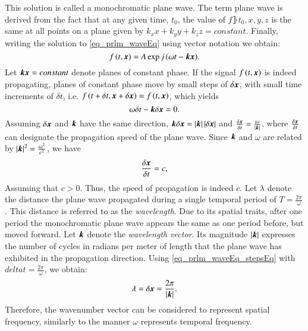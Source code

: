 This solution is called a monochromatic plane wave. The term plane wave is derived from the fact that at any given time, $t_{0}$, the value of $f\rBrace{t_{0},x,y,z}$ is the same at all points on a plane given by $k_{x}x+k_{y}y+k_{z}z = constant$.
Finally, writing the solution to \eqref{eq_prlm_waveEq} using vector notation we obtain:
\begin{equation}
\label{eq_prlm_waveEq_finSol}
f\left({t,\boldsymbol{x}}\right)=A\exp{j\left({\omega{t}-\boldsymbol{k}\boldsymbol{x}}\right)}.
\end{equation}
Let $\boldsymbol{k}\boldsymbol{x}=constant$ denote planes of constant phase. 
If the signal $f\left({t,\boldsymbol{x}}\right)$ is indeed propagating, planes of constant phase move by small steps of $\delta{\boldsymbol{x}}$, with small time increments of $\delta{t}$, i.e. $f\left({t+\delta{t},\boldsymbol{x}+\delta{\boldsymbol{x}}}\right) = f\left({t,\boldsymbol{x}}\right)$, which yields
\begin{equation}
\omega\delta{t}-\boldsymbol{k}\delta\boldsymbol{x}=0.
\end{equation}
Assuming $\delta\boldsymbol{x}$ and $\boldsymbol{k}$ have the same direction, $\boldsymbol{k}\delta\boldsymbol{x} = \left\vert\boldsymbol{k}\right\vert\left\vert\delta\boldsymbol{x}\right\vert$ and $\frac{\delta{\boldsymbol{x}}}{\delta{t}} = \frac{\omega}{\left\vert\boldsymbol{k}\right\vert}$, where $\frac{\delta{\boldsymbol{x}}}{\delta{t}}$ can designate the propagation speed of the plane wave. 
Since $\boldsymbol{k}$ and $\omega$ are related by $\left\vert\boldsymbol{k}\right\vert^{2}=\frac{\omega^{2}}{c^{2}}$, we have
\begin{equation}
\label{eq_prlm_waveEq_stepsEq}
\frac{\delta{\boldsymbol{x}}}{\delta{t}}=c,
\end{equation}
Assuming that $c>0$.
Thus, the speed of propagation is indeed $c$.
Let $\lambda$ denote the distance the plane wave propagated during a single temporal period of $T=\frac{2\pi}{\omega}$.
This distance is referred to as the \emph{wavelength}. 
Due to its spatial traits, after one period the monochromatic plane wave appears the same as one period before, but moved forward.
Let $\boldsymbol{k}$ denote the \emph{wavelength vector}. 
Its magnitude $\left\vert\boldsymbol{k}\right\vert$ expresses the number of cycles in radians per meter of length that the plane wave has exhibited in the propagation direction.
Using \eqref{eq_prlm_waveEq_stepsEq} with $delta{t} = \frac{2\pi}{\omega}$, we obtain:
\begin{equation}
\lambda=\delta{\boldsymbol{x}}=\frac{2\pi}{\left\vert\boldsymbol{k}\right\vert}.
\end{equation}
Therefore, the wavenumber vector can be considered to represent spatial frequency, similarly to the manner $\omega$ represents temporal frequency.